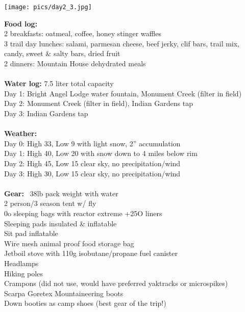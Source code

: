\documentclass[10pt,a4paper]{article}
\newenvironment{Figure}
  {\par\medskip\noindent\minipage{\linewidth}}
  {\endminipage\par\medskip}
\begin{document}
\begin{multicols}{2}
\begin{Figure}
 \centering
 \texttt{[image: pics/day2\_3.jpg]}
\end{Figure}

\textbf{Food log: }\\
2 breakfasts: oatmeal, coffee, honey stinger waffles\\
	3 trail day lunches: salami, parmesan cheese, beef jerky, clif bars, trail mix, candy, sweet \& salty bars, dried fruit\\
	2 dinners: Mountain House dehydrated meals
\\
\\
\textbf{Water log:} 7.5 liter total capacity\\
	Day 1: Bright Angel Lodge water fountain, Monument Creek (filter in field)\\
	Day 2: Monument Creek (filter in field), Indian Gardens tap\\
	Day 3: Indian Gardens tap
\\
\\
\textbf{Weather:}\\
	Day 0: High 33, Low 9 with light snow, 2” accumulation\\
	Day 1: High 40, Low 20 with snow down to 4 miles below rim\\
	Day 2: High 45, Low 15 clear sky, no precipitation/wind\\
	Day 3: High 30, Low 15 clear sky, no precipitation/wind
\\
\\
\textbf{Gear:} ~38lb pack weight with water\\
	2 person/3 season tent w/ fly \\
0o sleeping bags with reactor extreme +25O liners\\
	Sleeping pads insulated \& inflatable\\
	Sit pad inflatable \\
Wire mesh animal proof food storage bag\\
	Jetboil stove with 110g isobutane/propane fuel canister\\
	Headlamps \\
Hiking poles\\
	Crampons (did not use, would have preferred yaktracks or microspikes)\\
	Scarpa Goretex Mountaineering boots\\
	Down booties as camp shoes (best gear of the trip!)\\

\end{multicols}
\end{document}
